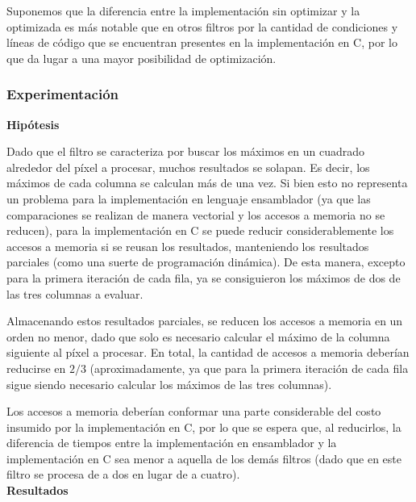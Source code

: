 \documentclass[a4paper]{article}
\begin{document}
Suponemos que la diferencia entre la implementación sin optimizar y la optimizada es más notable que en otros filtros por la cantidad de condiciones y líneas de código que se encuentran presentes en la implementación en C, por lo que da lugar a una mayor posibilidad de optimización.
\\
\subsubsection{Experimentación}
\textbf{Hipótesis}

Dado que el filtro se caracteriza por buscar los máximos en un cuadrado alrededor del píxel a procesar, muchos resultados se solapan. Es decir, los máximos de cada columna se calculan más de una vez. Si bien esto no representa un problema para la implementación en lenguaje ensamblador (ya que las comparaciones se realizan de manera vectorial y los accesos a memoria no se reducen), para la implementación en C se puede reducir considerablemente los accesos a memoria si se reusan los resultados, manteniendo los resultados parciales (como una suerte de programación dinámica). De esta manera, excepto para la primera iteración de cada fila, ya se consiguieron los máximos de dos de las tres columnas a evaluar.

Almacenando estos resultados parciales, se reducen los accesos a memoria en un orden no menor, dado que solo es necesario calcular el máximo de la columna siguiente al píxel a procesar. En total, la cantidad de accesos a memoria deberían reducirse en $2/3$ (aproximadamente, ya que para la primera iteración de cada fila sigue siendo necesario calcular los máximos de las tres columnas).

Los accesos a memoria deberían conformar una parte considerable del costo insumido por la implementación en C, por lo que se espera que, al reducirlos, la diferencia de tiempos entre la implementación en ensamblador y la implementación en C sea menor a aquella de los demás filtros (dado que en este filtro se procesa de a dos en lugar de a cuatro).
\\

\textbf{Resultados}
\end{document}
